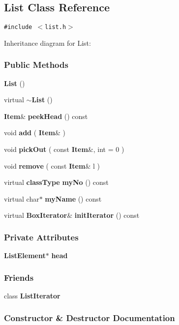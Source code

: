 \subsection{List  Class Reference}
\label{List}
{\tt \#include $<$list.h$>$}

Inheritance diagram for List:\begin{figure}[H]
\begin{center}
\leavevmode
\setlength{\epsfysize}{5cm}
\end{center}
\end{figure}
\subsubsection*{Public Methods}
\begin{CompactItemize}
\item 
{\bf List} ()
\item 
virtual {\bf $\sim$List} ()
\item 
{\bf Item}\& {\bf peek\-Head} () const
\item 
void {\bf add} ( {\bf Item}\& )
\item 
void {\bf pick\-Out} ( const {\bf Item}\&, int = 0 )
\item 
void {\bf remove} ( const {\bf Item}\& l )
\item 
virtual {\bf class\-Type} {\bf my\-No} () const
\item 
virtual char$\ast$ {\bf my\-Name} () const
\item 
virtual {\bf Box\-Iterator}\& {\bf init\-Iterator} () const
\end{CompactItemize}
\subsubsection*{Private Attributes}
\begin{CompactItemize}
\item 
{\bf List\-Element}$\ast$ {\bf head}
\end{CompactItemize}
\subsubsection*{Friends}
\begin{CompactItemize}
\item 
class {\bf List\-Iterator}
\end{CompactItemize}


\subsubsection{Constructor \& Destructor Documentation}
\label{List_a0}
